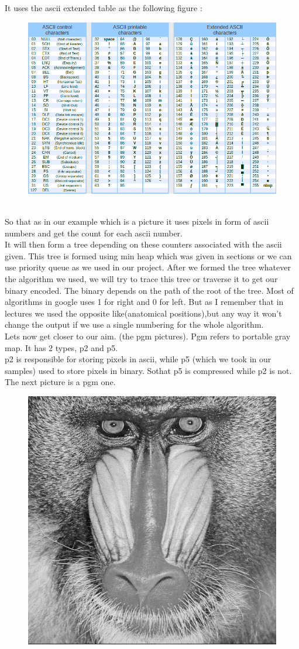 \documentclass[11 pt,twocolumn,letterpaper]{article}
\begin{document}
It uses the ascii extended table as the following figure \cite{ ASCII}:\\
\begin{figure}[ht]
   \includegraphics[width=0.8\linewidth]{figure 1}
\end{figure}\\
So that as in our example which is a picture it uses pixels in form of ascii numbers and get the count for each ascii number.\\
It will then form a tree depending on these counters associated with the ascii given. This tree is formed using min heap which was given in sections or we can use priority queue as we used in our project.
After we formed the tree whatever the algorithm we used, we will try to trace this tree or traverse it to get our binary encoded.
The binary depends on the path of the root of the tree. Most of algorithms in google uses 1 for right and 0 for left. But as I remember that in lectures we used the opposite like(anatomical positions),but any way it won’t change the output if we use a single numbering for the whole algorithm.\\
Lets now get closer to our aim. (the pgm pictures).
Pgm refers to portable gray map. It has 2 types, p2 and p5.\cite{PGM}\\
p2 is responsible for storing pixels in ascii, while p5 (which we took in our samples) used to store pixels in binary. Sothat p5 is compressed while p2 is not.
The next picture is a pgm one\cite{PGMB}.
\begin{figure}[ht]
   \includegraphics[width=0.8\linewidth]{figure 2}
\end{figure} 
\end{document}
